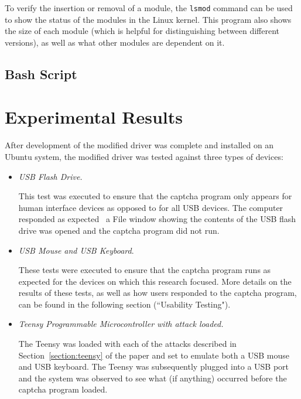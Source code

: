 \documentclass[pagenumbers]{ieee}
\begin{document}
To verify the insertion or removal of a module, the \texttt{lsmod} command can be used to show the status of the modules in the Linux kernel. This program also shows the size of each module (which is helpful for distinguishing between different versions), as well as what other modules are dependent on it.


\subsection{Bash Script}


\section{Experimental Results}

After development of the modified driver was complete and installed on an Ubuntu system, the modified driver was tested against three types of devices: 

\begin{itemize}
\item \textit{USB Flash Drive.}

This test was executed to ensure that the captcha program only appears for human interface devices as opposed to for all USB devices. The computer responded as expected \textemdash \ a File window showing the contents of the USB flash drive was opened and the captcha program did not run.

\item \textit{USB Mouse and USB Keyboard}.

These tests were executed to ensure that the captcha program runs as expected for the devices on which this research focused. More details on the results of these tests, as well as how users responded to the captcha program, can be found in the following section (``Usability Testing").

\item \textit{Teensy Programmable Microcontroller with attack loaded.}

The Teensy was loaded with each of the attacks described in Section~\ref{section:teensy} of the paper and set to emulate both a USB mouse and USB keyboard. The Teensy was subsequently plugged into a USB port and the system was observed to see what (if anything) occurred before the captcha program loaded.

\end{itemize}
\end{document}
